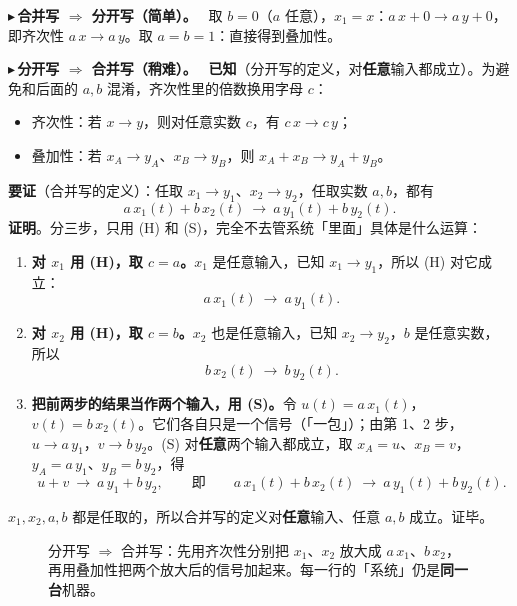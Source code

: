 \documentclass[UTF8,a4paper,11pt]{ctexart}
\newcounter{ex}[section]
\newcommand{\point}[1]{\par\addvspace{1ex}\noindent\textcolor{ptteal}{$\blacktriangleright$\,\textbf{#1}}\ }
\newcommand{\sysline}[4]{%
  \node[anchor=east] at (2.9,#1) {#2};
  \draw[->,thick] (3.0,#1) -- (3.8,#1);
  \node[draw,rounded corners=2pt,fill=blue!6,minimum width=1.3cm,minimum height=0.62cm] at (4.45,#1) {\small 系统};
  \draw[->,thick] (5.1,#1) -- (5.9,#1);
  \node[anchor=west] at (6.0,#1) {#3};
  \node[anchor=west,gray!55!black,font=\footnotesize] at (9.4,#1) {#4};}
\begin{document}
\point{合并写 $\Rightarrow$ 分开写（简单）。}
取 $b=0$（$a$ 任意），$x_1=x$：$a\,x+0\to a\,y+0$，即齐次性 $a\,x\to a\,y$。取 $a=b=1$：直接得到叠加性。

\point{分开写 $\Rightarrow$ 合并写（稍难）。}
\textbf{已知}（分开写的定义，对\textbf{任意}输入都成立）。为避免和后面的 $a,b$ 混淆，齐次性里的倍数换用字母 $c$：
\begin{itemize}[nosep]
\item[(H)] 齐次性：若 $x\to y$，则对任意实数 $c$，有 $c\,x\to c\,y$；
\item[(S)] 叠加性：若 $x_A\to y_A$、$x_B\to y_B$，则 $x_A+x_B\to y_A+y_B$。
\end{itemize}
\textbf{要证}（合并写的定义）：任取 $x_1\to y_1$、$x_2\to y_2$，任取实数 $a,b$，都有
\[
a\,x_1(t)+b\,x_2(t)\ \to\ a\,y_1(t)+b\,y_2(t).
\]
\textbf{证明}。分三步，只用 (H) 和 (S)，完全不去管系统「里面」具体是什么运算：
\begin{enumerate}
\item \textbf{对 $x_1$ 用 (H)，取 $c=a$。}$x_1$ 是任意输入，已知 $x_1\to y_1$，所以 (H) 对它成立：
\[
a\,x_1(t)\ \to\ a\,y_1(t).
\]
\item \textbf{对 $x_2$ 用 (H)，取 $c=b$。}$x_2$ 也是任意输入，已知 $x_2\to y_2$，$b$ 是任意实数，所以
\[
b\,x_2(t)\ \to\ b\,y_2(t).
\]
\item \textbf{把前两步的结果当作两个输入，用 (S)。}令 $u(t)=a\,x_1(t)$，$v(t)=b\,x_2(t)$。它们各自只是一个信号（「一包」）；由第 1、2 步，$u\to a\,y_1$，$v\to b\,y_2$。(S) 对\textbf{任意}两个输入都成立，取 $x_A=u$、$x_B=v$，$y_A=a\,y_1$、$y_B=b\,y_2$，得
\[
u+v\ \to\ a\,y_1+b\,y_2,\qquad\text{即}\qquad a\,x_1(t)+b\,x_2(t)\ \to\ a\,y_1(t)+b\,y_2(t).
\]
\end{enumerate}
$x_1,x_2,a,b$ 都是任取的，所以合并写的定义对\textbf{任意}输入、任意 $a,b$ 成立。证毕。

\begin{figure}[H]
\centering
{}
\caption{分开写 $\Rightarrow$ 合并写：先用齐次性分别把 $x_1$、$x_2$ 放大成 $a\,x_1$、$b\,x_2$，再用叠加性把两个放大后的信号加起来。每一行的「系统」仍是\textbf{同一台}机器。}
\end{figure}
\end{document}
